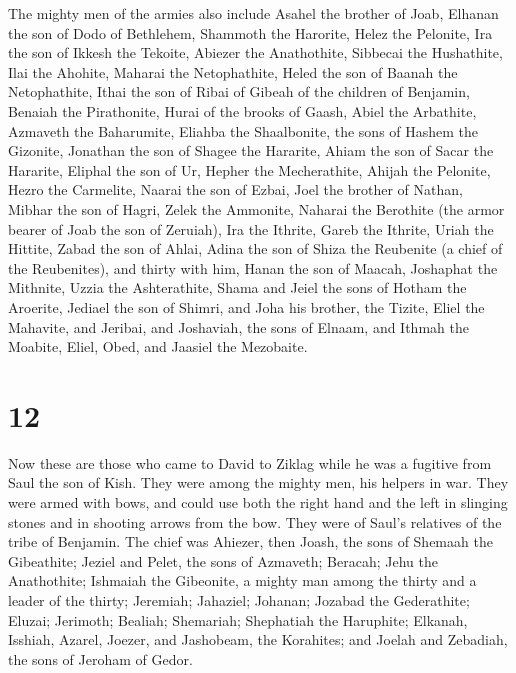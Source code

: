  The mighty men of the armies also include Asahel the
brother of Joab, Elhanan the son of Dodo of Bethlehem, 
Shammoth the Harorite, Helez the Pelonite,  Ira the son
of Ikkesh the Tekoite, Abiezer the Anathothite,  Sibbecai
the Hushathite, Ilai the Ahohite,  Maharai the
Netophathite, Heled the son of Baanah the Netophathite, 
Ithai the son of Ribai of Gibeah of the children of Benjamin, Benaiah
the Pirathonite,  Hurai of the brooks of Gaash, Abiel the
Arbathite,  Azmaveth the Baharumite, Eliahba the
Shaalbonite,  the sons of Hashem the Gizonite, Jonathan
the son of Shagee the Hararite,  Ahiam the son of Sacar
the Hararite, Eliphal the son of Ur,  Hepher the
Mecherathite, Ahijah the Pelonite,  Hezro the Carmelite,
Naarai the son of Ezbai,  Joel the brother of Nathan,
Mibhar the son of Hagri,  Zelek the Ammonite, Naharai the
Berothite (the armor bearer of Joab the son of Zeruiah), 
Ira the Ithrite, Gareb the Ithrite,  Uriah the Hittite,
Zabad the son of Ahlai,  Adina the son of Shiza the
Reubenite (a chief of the Reubenites), and thirty with him,
 Hanan the son of Maacah, Joshaphat the Mithnite,
 Uzzia the Ashterathite, Shama and Jeiel the sons of
Hotham the Aroerite,  Jediael the son of Shimri, and Joha
his brother, the Tizite,  Eliel the Mahavite, and
Jeribai, and Joshaviah, the sons of Elnaam, and Ithmah the Moabite,
 Eliel, Obed, and Jaasiel the Mezobaite.

\hypertarget{section-11}{%
\section{12}\label{section-11}}

 Now these are those who came to David to Ziklag while he
was a fugitive from Saul the son of Kish. They were among the mighty
men, his helpers in war.  They were armed with bows, and
could use both the right hand and the left in slinging stones and in
shooting arrows from the bow. They were of Saul's relatives of the tribe
of Benjamin.  The chief was Ahiezer, then Joash, the sons
of Shemaah the Gibeathite; Jeziel and Pelet, the sons of Azmaveth;
Beracah; Jehu the Anathothite;  Ishmaiah the Gibeonite, a
mighty man among the thirty and a leader of the thirty; Jeremiah;
Jahaziel; Johanan; Jozabad the Gederathite;  Eluzai;
Jerimoth; Bealiah; Shemariah; Shephatiah the Haruphite; 
Elkanah, Isshiah, Azarel, Joezer, and Jashobeam, the Korahites;
 and Joelah and Zebadiah, the sons of Jeroham of Gedor.

